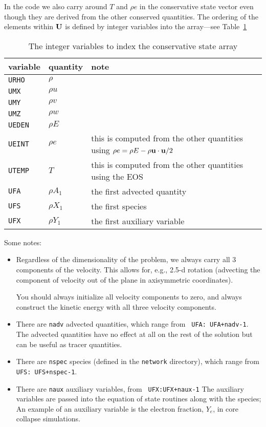 In the code we also carry around $T$ and $\rho e$ in the conservative
state vector even though they are derived from the other conserved
quantities.  The ordering of the elements within ${\bf U}$ is defined
by integer variables into the array---see
Table~\ref{table:consints}
\begin{table}[t]
  \centering
\begin{tabular}{llp{3.5in}}
  \hline
      {\bf variable} & {\bf quantity} & {\bf note} \\
  \hline
{\tt URHO} & $\rho$ \\
{\tt UMX} & $\rho u$ \\
{\tt UMY} & $\rho v$ \\
{\tt UMZ} & $\rho w$ \\
{\tt UEDEN} & $\rho E$ \\
{\tt UEINT} & $\rho e$ & this is computed from the other quantities using
             $\rho e = \rho E - \rho {\bf u} \cdot {\bf u} / 2$ \\
{\tt UTEMP} & $T$  & this is computed from the other quantities using the EOS \\
{\tt UFA} & $\rho A_1$ & the first advected quantity \\
{\tt UFS} & $\rho X_1$ & the first species \\
{\tt UFX} & $\rho Y_1$ & the first auxiliary variable \\
\hline
\end{tabular}
\caption{\label{table:consints} The integer variables to index the conservative state array}
\end{table}

Some notes:
\begin{itemize}
\item Regardless of the dimensionality of the problem, we always carry
  all 3 components of the velocity.  This allows for, e.g., 2.5-d
  rotation (advecting the component of velocity out of the plane in
  axisymmetric coordinates).  

  You should always initialize all velocity components to zero, and
  always construct the kinetic energy with all three velocity components.

\item There are {\tt nadv} advected quantities, which range from {\tt
  UFA: UFA+nadv-1}.  The advected quantities have no effect at all on
  the rest of the solution but can be useful as tracer quantities.

\item There are {\tt nspec} species (defined in the {\tt network}
  directory), which range from {\tt UFS: UFS+nspec-1}.

\item There are {\tt naux} auxiliary variables, from {\tt
  UFX:UFX+naux-1} The auxiliary variables are passed into the equation
  of state routines along with the species; An example of an auxiliary
  variable is the electron fraction, $Y_e$, in core collapse simulations.
\end{itemize}


